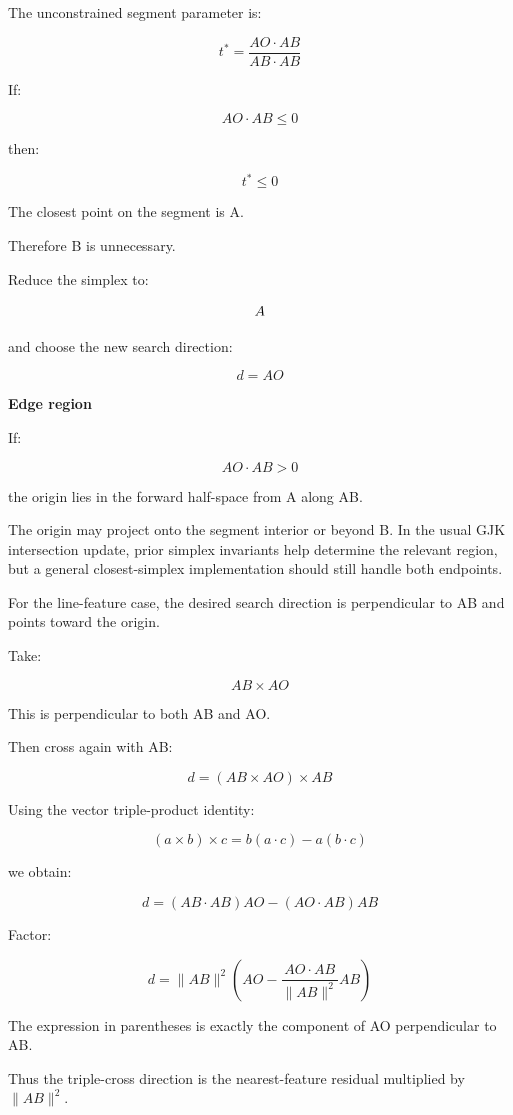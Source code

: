 The unconstrained segment parameter is:

\[
t^*=\frac{AO\cdot AB}{AB\cdot AB}
\]

If:

\[
AO\cdot AB\le0
\]

then:

\[
t^*\le0
\]

The closest point on the segment is A.

Therefore B is unnecessary.

Reduce the simplex to:

\[
\\{A\\}
\]

and choose the new search direction:

\[
\boxed{d=AO}
\]

\textbf{Edge region}

If:

\[
AO\cdot AB>0
\]

the origin lies in the forward half-space from A along AB.

The origin may project onto the segment interior or beyond B. In the usual GJK intersection update, prior simplex invariants help determine the relevant region, but a general closest-simplex implementation should still handle both endpoints.

For the line-feature case, the desired search direction is perpendicular to AB and points toward the origin.

Take:

\[
AB\times AO
\]

This is perpendicular to both AB and AO.

Then cross again with AB:

\[
\boxed{ d=(AB\times AO)\times AB }
\]

Using the vector triple-product identity:

\[
(a\times b)\times c = b(a\cdot c)-a(b\cdot c)
\]

we obtain:

\[
d=(AB\cdot AB)AO-(AO\cdot AB)AB
\]

Factor:

\[
\boxed{ d=\|AB\|^2 \left( AO-\frac{AO\cdot AB}{\|AB\|^2}AB \right) }
\]

The expression in parentheses is exactly the component of AO perpendicular to AB.

Thus the triple-cross direction is the nearest-feature residual multiplied by \(\|AB\|^2\).

